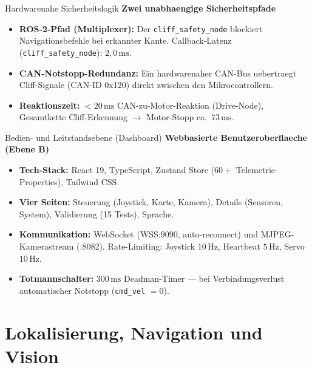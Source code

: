 \documentclass[aspectratio=169]{beamer}
\begin{document}
\begin{frame}{Hardwarenahe Sicherheitslogik}
  \textbf{Zwei unabhaengige Sicherheitspfade}
  \begin{itemize}
    \item \textbf{ROS-2-Pfad (Multiplexer):} Der \texttt{cliff\_safety\_node} blockiert Navigationsbefehle bei erkannter Kante. Callback-Latenz (\texttt{cliff\_safety\_node}): $2{,}0\,\mathrm{ms}$.
    \item \textbf{CAN-Notstopp-Redundanz:} Ein hardwarenaher CAN-Bus uebertraegt Cliff-Signale (CAN-ID 0x120) direkt zwischen den Mikrocontrollern.
    \item \textbf{Reaktionszeit:} $< 20\,\mathrm{ms}$ CAN-zu-Motor-Reaktion (Drive-Node), Gesamtkette Cliff-Erkennung $\rightarrow$ Motor-Stopp ca.\ $73\,\mathrm{ms}$.
  \end{itemize}
\end{frame}

\begin{frame}{Bedien- und Leitstandsebene (Dashboard)}
  \textbf{Webbasierte Benutzeroberflaeche (Ebene B)}
  \begin{itemize}
    \item \textbf{Tech-Stack:} React 19, TypeScript, Zustand Store ($60+$ Telemetrie-Properties), Tailwind CSS.
    \item \textbf{Vier Seiten:} Steuerung (Joystick, Karte, Kamera), Details (Sensoren, System), Validierung (15 Tests), Sprache.
    \item \textbf{Kommunikation:} WebSocket (WSS:9090, auto-reconnect) und MJPEG-Kamerastream (:8082). Rate-Limiting: Joystick $10\,\mathrm{Hz}$, Heartbeat $5\,\mathrm{Hz}$, Servo $10\,\mathrm{Hz}$.
    \item \textbf{Totmannschalter:} $300\,\mathrm{ms}$ Deadman-Timer --- bei Verbindungsverlust automatischer Notstopp (\texttt{cmd\_vel} $= 0$).
  \end{itemize}
\end{frame}

\section{Lokalisierung, Navigation und Vision}
\end{document}
